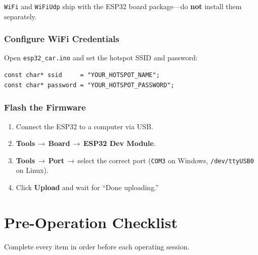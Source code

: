 ﻿\documentclass[12pt, letterpaper]{article}
\begin{document}
\begin{notebox}
\texttt{WiFi} and \texttt{WiFiUdp} ship with the ESP32 board package---do \textbf{not}
install them separately.
\end{notebox}

\subsubsection*{Configure WiFi Credentials}

Open \texttt{esp32\_car.ino} and set the hotspot SSID and password:

\begin{lstlisting}[style=cpp]
const char* ssid     = "YOUR_HOTSPOT_NAME";
const char* password = "YOUR_HOTSPOT_PASSWORD";
\end{lstlisting}

\subsubsection*{Flash the Firmware}

\begin{enumerate}
  \item Connect the ESP32 to a computer via USB.
  \item \textbf{Tools\,$\to$\,Board}\,$\to$\,\textbf{ESP32 Dev Module}.
  \item \textbf{Tools\,$\to$\,Port}\,$\to$\,select the correct port
        (\texttt{COM3} on Windows, \texttt{/dev/ttyUSB0} on Linux).
  \item Click \textbf{Upload} and wait for ``Done uploading.''
\end{enumerate}

\section{Pre-Operation Checklist}

Complete every item in order before each operating session.
\end{document}
